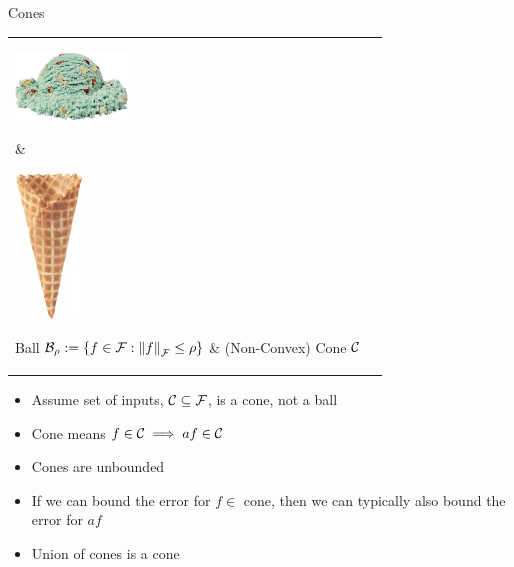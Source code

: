 \documentclass[11pt,compress,xcolor={usenames,dvipsnames},aspectratio=169]{beamer}
\newcommand{\scoop}[1]{\parbox{#1}{\includegraphics[width=#1]{IceCreamScoop.eps}}\xspace}
\newcommand{\largescoop}{\scoop{3cm}}
\newcommand{\ICcone}[1]{\parbox{#1}{\includegraphics[width=#1,angle=270]{MediumWaffleCone.eps}}\xspace}
\newcommand{\largecone}{\ICcone{1.8cm}}
\begin{document}
\begin{frame}{Cones}
\vspace{-4ex}
\begin{tabular}{>{\centering}m{}@{\qquad}>{\centering}m{}}
     \largescoop \hspace{-3cm}\raisebox{-4ex}{\color{red}\fontsize{100}{120}\selectfont $\times$} & 
      \largecone \tabularnewline
      Ball $\cb_{\rho} := \{f \in \cf : \norm[\cf]{f} \le \rho \}$ &
      \hspace{2cm} (Non-Convex) Cone $\cc$
\end{tabular}

\begin{itemize}
    \item Assume set of inputs, $\cc \subseteq \cf$, is a \alert{cone}, not a ball
    
    \item \alert{Cone} means $f \in \cc \implies af \in \cc$
    
    \item \alert{Cones} are unbounded
    
    \item If we can bound the error for $f \in $ \alert{cone}, then we can typically also bound the error  for $af$
    
    \item Union of \alert{cones} is a \alert{cone}
\end{itemize}

    
\end{frame}
\end{document}
